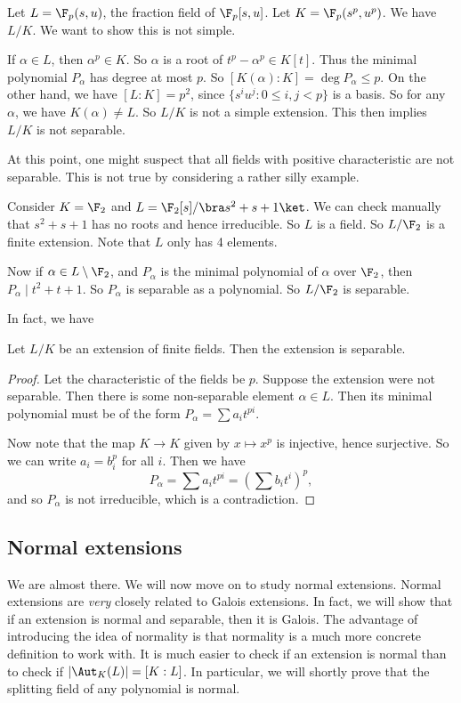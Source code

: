 \documentclass[a4paper]{article}
\begin{document}
\begin{eg}
  Let $L = \F_p(s, u)$, the fraction field of $\F_p[s, u]$. Let $K = \F_p(s^p, u^p)$. We have $L/K$. We want to show this is not simple.

  If $\alpha \in L$, then $\alpha^p \in K$. So $\alpha$ is a root of $t^p - \alpha^p \in K[t]$. Thus the minimal polynomial $P_\alpha$ has degree at most $p$. So $[K(\alpha): K] = \deg P_\alpha \leq p$. On the other hand, we have $[L:K] = p^2$, since $\{s^iu^j: 0 \leq i, j < p\}$ is a basis. So for any $\alpha$, we have $K(\alpha) \not= L$. So $L/K$ is not a simple extension. This then implies $L/K$ is not separable.
\end{eg}
At this point, one might suspect that all fields with positive characteristic are not separable. This is not true by considering a rather silly example.
\begin{eg}
  Consider $K = \F_2$ and $L = \F_2[s]/\bra s^2 + s + 1\ket$. We can check manually that $s^2 + s + 1$ has no roots and hence irreducible. So $L$ is a field. So $L/\F_2$ is a finite extension. Note that $L$ only has 4 elements.

  Now if $\alpha \in L \setminus \F_2$, and $P_\alpha$ is the minimal polynomial of $\alpha$ over $\F_2$, then $P_\alpha\mid t^2 + t + 1$. So $P_\alpha$ is separable as a polynomial. So $L/\F_2$ is separable.
\end{eg}

In fact, we have
\begin{prop}
  Let $L/K$ be an extension of finite fields. Then the extension is separable.
\end{prop}

\begin{proof}
  Let the characteristic of the fields be $p$. Suppose the extension were not separable. Then there is some non-separable element $\alpha \in L$. Then its minimal polynomial must be of the form $P_\alpha = \sum a_i t^{pi}$.

  Now note that the map $K \to K$ given by $x \mapsto x^p$ is injective, hence surjective. So we can write $a_i = b_i^p$ for all $i$. Then we have
  \[
    P_\alpha = \sum a_i t^{pi} = \left(\sum b_i t^i\right)^p,
  \]
  and so $P_\alpha$ is not irreducible, which is a contradiction.
\end{proof}

\subsection{Normal extensions}
We are almost there. We will now move on to study normal extensions. Normal extensions are \emph{very} closely related to Galois extensions. In fact, we will show that if an extension is normal and separable, then it is Galois. The advantage of introducing the idea of normality is that normality is a much more concrete definition to work with. It is much easier to check if an extension is normal than to check if $|\Aut_K(L)| = [K:L]$. In particular, we will shortly prove that the splitting field of any polynomial is normal.
\end{document}
